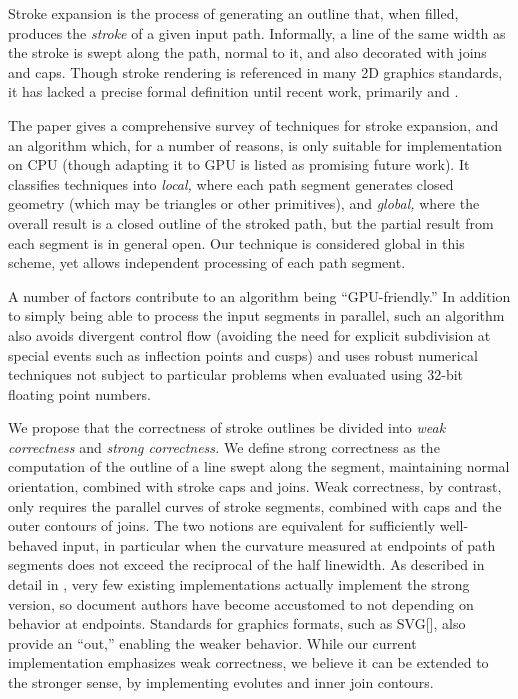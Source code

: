 \documentclass[sigconf, authordraft]{acmart}
\begin{document}
Stroke expansion is the process of generating an outline that, when filled, produces the \emph{stroke} of a given input path. Informally, a line of the same width as the stroke is swept along the path, normal to it, and also decorated with joins and caps. Though stroke rendering is referenced in many 2D graphics standards, it has lacked a precise formal definition until recent work, primarily \citet{Nehab2020} and \citet{Kilgard2020}.

The \citet{Nehab2020} paper gives a comprehensive survey of techniques for stroke expansion, and an algorithm which, for a number of reasons, is only suitable for implementation on CPU (though adapting it to GPU is listed as promising future work). It classifies techniques into \emph{local,} where each path segment generates closed geometry (which may be triangles or other primitives), and \emph{global,} where the overall result is a closed outline of the stroked path, but the partial result from each segment is in general open. Our technique is considered global in this scheme, yet allows independent processing of each path segment.

A number of factors contribute to an algorithm being ``GPU-friendly.'' In addition to simply being able to process the input segments in parallel, such an algorithm also avoids divergent control flow (avoiding the need for explicit subdivision at special events such as inflection points and cusps) and uses robust numerical techniques not subject to particular problems when evaluated using 32-bit floating point numbers.

We propose that the correctness of stroke outlines be divided into \emph{weak correctness} and \emph{strong correctness.} We define strong correctness as the computation of the outline of a line swept along the segment, maintaining normal orientation, combined with stroke caps and joins. Weak correctness, by contrast, only requires the parallel curves of stroke segments, combined with caps and the outer contours of joins. The two notions are equivalent for sufficiently well-behaved input, in particular when the curvature measured at endpoints of path segments does not exceed the reciprocal of the half linewidth. As described in detail in \citet{Nehab2020}, very few existing implementations actually implement the strong version, so document authors have become accustomed to not depending on behavior at endpoints. Standards for graphics formats, such as SVG[], also provide an ``out,'' enabling the weaker behavior. While our current implementation emphasizes weak correctness, we believe it can be extended to the stronger sense, by implementing evolutes and inner join contours.
\end{document}
